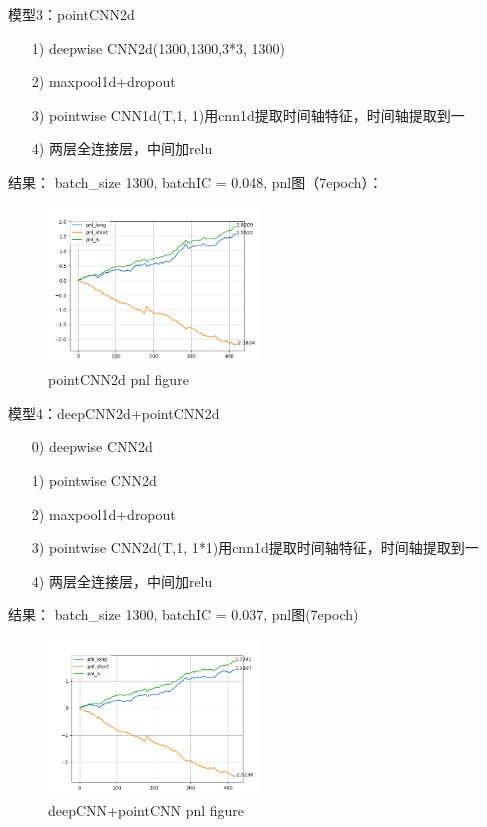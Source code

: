 \documentclass[11pt]{ctexart}
\begin{document}
模型3：pointCNN2d
\begin{itemize}
  \item [1)]
  deepwise CNN2d(1300,1300,3*3, 1300)
  \item [2)]
  maxpool1d+dropout
  \item [3)]
  pointwise CNN1d(T,1, 1)用cnn1d提取时间轴特征，时间轴提取到一
  \item [4)]
  两层全连接层，中间加relu

\end{itemize}
结果： batch\_size 1300, batchIC = 0.048,
pnl图（7epoch）：
\begin{figure}[h!]
\begin{center}
\includegraphics[width=0.5\textwidth]{5.PNG}
\end{center}
\caption{pointCNN2d pnl figure}
\label{FIG.4}
\end{figure}

模型4：deepCNN2d+pointCNN2d
\begin{itemize}
  \item [0)]
  deepwise CNN2d
  \item [1)]
  pointwise CNN2d
  \item [2)]
  maxpool1d+dropout
  \item [3)]
  pointwise CNN2d(T,1, 1*1)用cnn1d提取时间轴特征，时间轴提取到一
  \item [4)]
  两层全连接层，中间加relu

\end{itemize}
结果： batch\_size 1300, batchIC = 0.037,
pnl图(7epoch)
\begin{figure}[h!]
\begin{center}
\includegraphics[width=0.5\textwidth]{3.PNG}
\end{center}
\caption{deepCNN+pointCNN pnl figure}
\label{FIG.5}
\end{figure}
\end{document}
